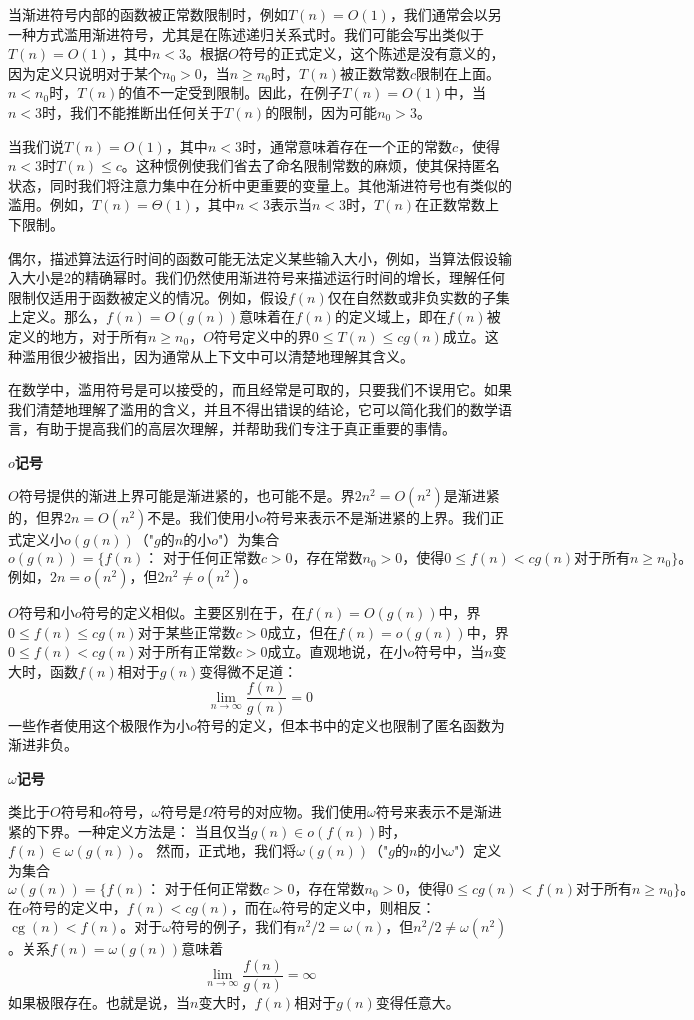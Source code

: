 \documentclass[lang=cn,newtx,10pt,scheme=chinese]{elegantbook}
\begin{document}
当渐进符号内部的函数被正常数限制时，例如$T(n)=O(1)$，我们通常会以另一种方式滥用渐进符号，尤其是在陈述递归关系式时。我们可能会写出类似于$T(n)=O(1)$，其中$n<3$。根据$O$符号的正式定义，这个陈述是没有意义的，因为定义只说明对于某个$n_0>0$，当$n \geq n_0$时，$T(n)$被正数常数$c$限制在上面。$n<n_0$时，$T(n)$的值不一定受到限制。因此，在例子$T(n)=O(1)$中，当$n<3$时，我们不能推断出任何关于$T(n)$的限制，因为可能$n_0>3$。

当我们说$T(n)=O(1)$，其中$n<3$时，通常意味着存在一个正的常数$c$，使得$n<3$时$T(n) \leq c$。这种惯例使我们省去了命名限制常数的麻烦，使其保持匿名状态，同时我们将注意力集中在分析中更重要的变量上。其他渐进符号也有类似的滥用。例如，$T(n)=\Theta(1)$，其中$n<3$表示当$n<3$时，$T(n)$在正数常数上下限制。

偶尔，描述算法运行时间的函数可能无法定义某些输入大小，例如，当算法假设输入大小是2的精确幂时。我们仍然使用渐进符号来描述运行时间的增长，理解任何限制仅适用于函数被定义的情况。例如，假设$f(n)$仅在自然数或非负实数的子集上定义。那么，$f(n)=O(g(n))$意味着在$f(n)$的定义域上，即在$f(n)$被定义的地方，对于所有$n \geq n_0$，$O$符号定义中的界$0 \leq T(n) \leq c g(n)$成立。这种滥用很少被指出，因为通常从上下文中可以清楚地理解其含义。

在数学中，滥用符号是可以接受的，而且经常是可取的，只要我们不误用它。如果我们清楚地理解了滥用的含义，并且不得出错误的结论，它可以简化我们的数学语言，有助于提高我们的高层次理解，并帮助我们专注于真正重要的事情。

\textbf{$o$记号}

$O$符号提供的渐进上界可能是渐进紧的，也可能不是。界$2 n^2=O\left(n^2\right)$是渐进紧的，但界$2 n=O\left(n^2\right)$不是。我们使用小$o$符号来表示不是渐进紧的上界。我们正式定义小$o(g(n))$（"$g$的$n$的小$o$"）为集合
$$
o(g(n))=\{f(n)：\text { 对于任何正常数} c>0，\text{存在常数} n_0>0 \text {，使得} 0 \leq f(n)<c g(n) \text {对于所有} n \geq n_0\}。
$$
例如，$2 n=o\left(n^2\right)$，但$2 n^2 \neq o\left(n^2\right)$。

$O$符号和小$o$符号的定义相似。主要区别在于，在$f(n)=O(g(n))$中，界$0 \leq f(n) \leq c g(n)$对于某些正常数$c>0$成立，但在$f(n)=o(g(n))$中，界$0 \leq f(n)<c g(n)$对于所有正常数$c>0$成立。直观地说，在小$o$符号中，当$n$变大时，函数$f(n)$相对于$g(n)$变得微不足道：
$$
\lim _{n \rightarrow \infty} \frac{f(n)}{g(n)}=0
$$
一些作者使用这个极限作为小$o$符号的定义，但本书中的定义也限制了匿名函数为渐进非负。

\textbf{$\omega$记号}

类比于$O$符号和$o$符号，$\omega$符号是$\Omega$符号的对应物。我们使用$\omega$符号来表示不是渐进紧的下界。一种定义方法是：
当且仅当$g(n) \in o(f(n))$时，$f(n) \in \omega(g(n))$。
然而，正式地，我们将$\omega(g(n))$（"$g$的$n$的小$\omega$"）定义为集合
$$
\omega(g(n))=\{f(n)：\text { 对于任何正常数} c>0，\text{存在常数} n_0>0 \text {，使得} 0 \leq c g(n)<f(n) \text {对于所有} n \geq n_0\}。
$$
在$o$符号的定义中，$f(n)<c g(n)$，而在$\omega$符号的定义中，则相反：$\operatorname{cg}(n)<f(n)$。对于$\omega$符号的例子，我们有$n^2 / 2=\omega(n)$，但$n^2 / 2 \neq \omega\left(n^2\right)$。关系$f(n)=\omega(g(n))$意味着
$$
\lim _{n \rightarrow \infty} \frac{f(n)}{g(n)}=\infty
$$
如果极限存在。也就是说，当$n$变大时，$f(n)$相对于$g(n)$变得任意大。
\end{document}
